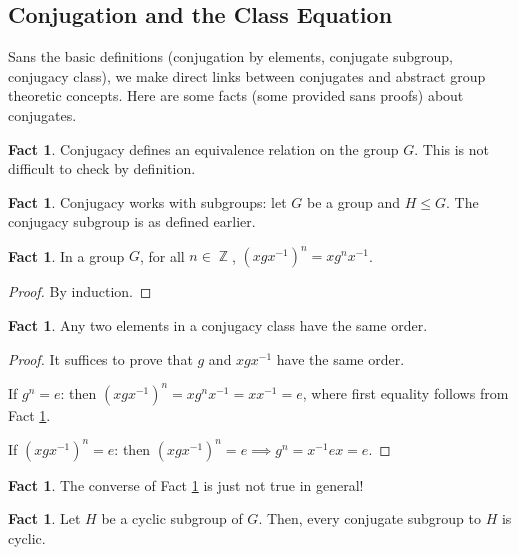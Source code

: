 \documentclass[11pt]{amsart} %
\theoremstyle{definition}
\newtheorem{fact}[definition]{Fact}
\theoremstyle{definition}
\DeclareMathOperator{\Z}{\mathbb{Z}}
\numberwithin{equation}{section}
\begin{document}
\subsection{Conjugation and the Class Equation}

Sans the basic definitions (conjugation by elements, conjugate subgroup, conjugacy class), we make direct links between conjugates and abstract group theoretic concepts. Here are some facts (some provided sans proofs) about conjugates.


\begin{fact}
	Conjugacy defines an equivalence relation on the group $G$. This is not difficult to check by definition.
\end{fact}


\begin{fact}
	Conjugacy works with subgroups: let $G$ be a group and $H \leq G$. The conjugacy subgroup is as defined earlier.
\end{fact}

\begin{fact}
	\label{factorderofconjugates}
	In a group $G$, for all $n \in \Z$, $(xgx^{-1})^n = xg^n x^{-1}$.
\end{fact}

\begin{proof}
	By induction.
\end{proof}


\begin{fact}
	\label{factrepresentativeofconjugacyclasses}
	Any two elements in a conjugacy class have the same order.
\end{fact}

\begin{proof}
	It suffices to prove that $g$ and $xgx^{-1}$ have the same order.
	
	If $g^n = e$: then $(xgx^{-1})^n = x g^n x^{-1} = x x^{-1} = e$, where first equality follows from Fact \ref{factorderofconjugates}.
	
	If $(xgx^{-1})^n = e$: then $(xgx^{-1})^n = e \implies g^n = x^{-1} e x = e $.
\end{proof}

\begin{fact}
	The converse of Fact \ref{factrepresentativeofconjugacyclasses} is just not true in general!
\end{fact}


\begin{fact}
	\label{factconjugatesubgroupofcyclicgroupiscyclic}
	Let $H $ be a cyclic subgroup of $G$. Then, every conjugate subgroup to $H$ is cyclic.
\end{fact}
\end{document}
